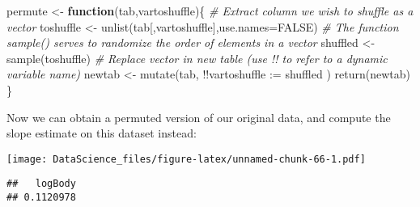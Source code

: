 \documentclass[
]{book}
\newenvironment{Shaded}{\begin{snugshade}}{\end{snugshade}}
\newcommand{\AttributeTok}[1]{\textcolor[rgb]{0.77,0.63,0.00}{#1}}
\newcommand{\CommentTok}[1]{\textcolor[rgb]{0.56,0.35,0.01}{\textit{#1}}}
\newcommand{\ConstantTok}[1]{\textcolor[rgb]{0.00,0.00,0.00}{#1}}
\newcommand{\ControlFlowTok}[1]{\textcolor[rgb]{0.13,0.29,0.53}{\textbf{#1}}}
\newcommand{\DecValTok}[1]{\textcolor[rgb]{0.00,0.00,0.81}{#1}}
\newcommand{\FunctionTok}[1]{\textcolor[rgb]{0.00,0.00,0.00}{#1}}
\newcommand{\NormalTok}[1]{#1}
\newcommand{\OtherTok}[1]{\textcolor[rgb]{0.56,0.35,0.01}{#1}}
\newcommand{\SpecialCharTok}[1]{\textcolor[rgb]{0.00,0.00,0.00}{#1}}
\newcommand{\StringTok}[1]{\textcolor[rgb]{0.31,0.60,0.02}{#1}}
\begin{document}
\begin{Shaded}
\begin{Highlighting}[]
\NormalTok{permute }\OtherTok{\textless{}{-}} \ControlFlowTok{function}\NormalTok{(tab,vartoshuffle)\{}
  \CommentTok{\# Extract column we wish to shuffle as a vector}
\NormalTok{  toshuffle }\OtherTok{\textless{}{-}} \FunctionTok{unlist}\NormalTok{(tab[,vartoshuffle],}\AttributeTok{use.names=}\ConstantTok{FALSE}\NormalTok{)}
  \CommentTok{\# The function sample() serves to randomize the order of elements in a vector}
\NormalTok{  shuffled }\OtherTok{\textless{}{-}} \FunctionTok{sample}\NormalTok{(toshuffle)}
  \CommentTok{\# Replace vector in new table (use !! to refer to a dynamic variable name)}
\NormalTok{  newtab }\OtherTok{\textless{}{-}} \FunctionTok{mutate}\NormalTok{(tab, }\SpecialCharTok{!!}\AttributeTok{vartoshuffle :=}\NormalTok{ shuffled )}
  \FunctionTok{return}\NormalTok{(newtab)}
\NormalTok{\}}
\end{Highlighting}
\end{Shaded}

Now we can obtain a permuted version of our original data, and compute the slope estimate on this dataset instead:

\begin{Shaded}
\end{Shaded}

\texttt{[image: DataScience\_files/figure-latex/unnamed-chunk-66-1.pdf]}

\begin{Shaded}
\end{Shaded}

\begin{verbatim}
##   logBody 
## 0.1120978
\end{verbatim}
\end{document}
